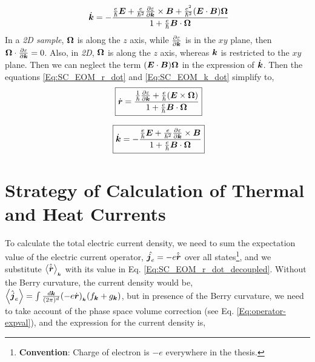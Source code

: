 \documentclass{report}
\renewcommand\vec[1]{\ensuremath\boldsymbol{#1}} %
\begin{document}
\begin{equation}~\label{Eq:SC_EOM_k_dot}
	\dot{\vec{k}} = -\frac{\frac{e}{\hbar} \vec{E} +\frac{e}{\hbar^2} \frac{\partial \varepsilon}{\partial \vec{k}} \times \vec{B} + \frac{e^2}{\hbar^2} (\vec{E}\cdot\vec{B}) \vec{\Omega}}{1 + \frac{e}{\hbar} \vec{B}\cdot\vec{\Omega}}
\end{equation}
In a \textit{2D sample}, $\vec{\Omega}$ is along the $z$ axis, while $\frac{\partial \varepsilon}{\partial \vec{k}}$ is in the $xy$ plane, then $\vec{\Omega} \cdot \frac{\partial \varepsilon}{\partial \vec{k}} = 0$. Also, in \textit{2D}, $\vec{\Omega}$ is along the $z$ axis, whereas $\vec{k}$ is restricted to the $xy$ plane. Then we can neglect the term $(\vec{E}\cdot\vec{B}) \vec{\Omega}$ in the expression of $\dot{\vec{k}}$.
Then the equations \eqref{Eq:SC_EOM_r_dot} and \eqref{Eq:SC_EOM_k_dot} simplify to,
\begin{equation}~\label{Eq:SC_EOM_r_dot_decoupled}
	\boxed{\dot{\vec{r}} = \frac{\frac{1}{\hbar} \frac{\partial \varepsilon}{\partial \vec{k}} + \frac{e}{\hbar} (\vec{E}\times\vec{\Omega})}{1 + \frac{e}{\hbar} \vec{B}\cdot\vec{\Omega}}}
\end{equation}

\begin{equation}~\label{Eq:SC_EOM_k_dot_decoupled}
	\boxed{\dot{\vec{k}} = -\frac{\frac{e}{\hbar} \vec{E} +\frac{e}{\hbar^2} \frac{\partial \varepsilon}{\partial \vec{k}} \times \vec{B}}{1 + \frac{e}{\hbar} \vec{B}\cdot\vec{\Omega}}}
\end{equation}
\chapter{Strategy of Calculation of Thermal and Heat Currents}
To calculate the total electric current density, we need to sum the expectation value of the electric current operator, $\hat{\vec{j}_e} = -e \hat{\dot{\vec{r}}}$ over all states\footnote{\textbf{Convention}: Charge of electron is $-e$ everywhere in the thesis.}, and we substitute $\expval{\hat{\dot{\vec{r}}}}_{_{\vec{k}}}$ with its value in Eq. \eqref{Eq:SC_EOM_r_dot_decoupled}. Without the Berry curvature, the current density would be, $\expval{\hat{\vec{j}}_e} = \int \frac{d\vec{k}}{(2\pi)^d} (- e \dot{\vec{r}})_{_{\vec{k}}} ({f}_{\vec{k}} + {g}_{\vec{k}})$, but in presence of the Berry curvature, we need to take account of the phase space volume correction (see Eq. \eqref{Eq:operator-expval}), and the expression for the current density is,
\end{document}
